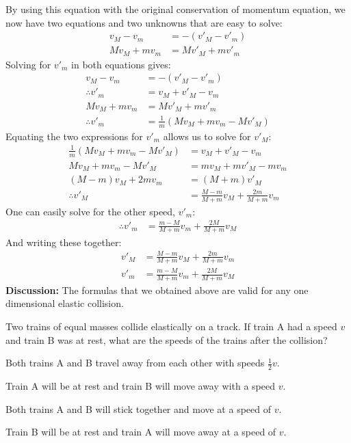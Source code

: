\begin{example}
By using this equation with the original conservation of momentum equation, we now have two equations and two unknowns that are easy to solve:
\begin{align*}
v_M-v_m &= - (v'_M-v'_m)\\
Mv_M+mv_m&=Mv'_M+mv'_m
\end{align*}
Solving for $v'_m$ in both equations gives:
\begin{align*}
v_M-v_m &= - (v'_M-v'_m)\\
\therefore v'_m &= v_M+v'_M-v_m\\
Mv_M+mv_m&=Mv'_M+mv'_m\\
\therefore v'_m&=\frac{1}{m}(Mv_M+mv_m-Mv'_M)
\end{align*}
Equating the two expressions for $v'_m$ allows us to solve for $v'_M$:
\begin{align*}
\frac{1}{m}(Mv_M+mv_m-Mv'_M)&=v_M+v'_M-v_m\\
Mv_M+mv_m-Mv'_M&=mv_M+mv'_M-mv_m\\
(M-m)v_M+2mv_m&=(M+m)v'_M\\
\therefore v'_M&=\frac{M-m}{M+m}v_M+\frac{2m}{M+m}v_m
\end{align*}
One can easily solve for the other speed, $v'_m$:
\begin{align*}
\therefore v'_m &= \frac{m-M}{M+m}v_m+\frac{2M}{M+m}v_M
\end{align*}
And writing these together:
\begin{align*}
v'_M&=\frac{M-m}{M+m}v_M+\frac{2m}{M+m}v_m\\
v'_m &= \frac{m-M}{M+m}v_m+\frac{2M}{M+m}v_M
\end{align*}
\textbf{Discussion:} The formulas that we obtained above are valid for any one dimensional elastic collision. 
\end{example}

\begin{checkpoint}
\begin{MCquestion}{Two trains of equal masses collide elastically on a track. If train A had a speed $v$ and train B was at rest, what are the speeds of the trains after the collision?}
\item Both trains A and B travel away from each other with speeds $\frac{1}{2}v$.
\item Train A will be at rest and train B will move away with a speed $v$.\correct
\item Both trains A and B will stick together and move at a speed of $v$.
\item Train B will be at rest and train A will move away at a speed of $v$.
\end{MCquestion}
\end{checkpoint}

